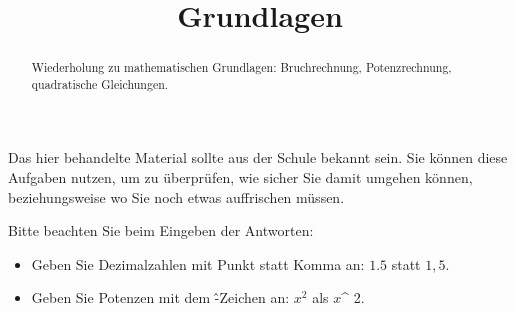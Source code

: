 \documentclass{ximera}
\title{Grundlagen}
\begin{document}
\begin{abstract}
Wiederholung zu mathematischen Grundlagen: Bruchrechnung, Potenzrechnung, quadratische Gleichungen.
\end{abstract}
\maketitle

Das hier behandelte Material sollte aus der Schule bekannt sein. Sie können diese Aufgaben nutzen, um zu überprüfen, wie sicher Sie damit umgehen können, beziehungsweise wo Sie noch etwas auffrischen müssen.

Bitte beachten Sie beim Eingeben der Antworten:
\begin{itemize}
\item
Geben Sie Dezimalzahlen mit Punkt statt Komma an: $1.5$ statt $1,5$.
\item
Geben Sie Potenzen mit dem \^-Zeichen an: $x^2$ als $x$\^{} 2.
\end{itemize}
\end{document}
